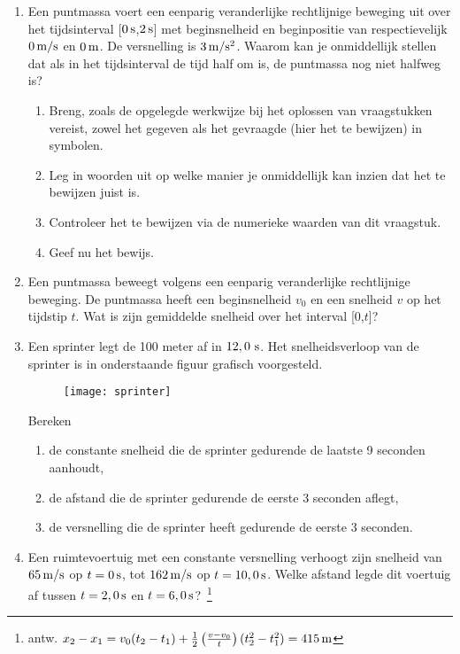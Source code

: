 \begin{enumerate}
\item Een puntmassa voert een eenparig veranderlijke rechtlijnige
beweging uit over het tijdsinterval [$0\rm\,s$,$2\rm\,s$] met
beginsnelheid en beginpositie van respectievelijk $0\rm\,m/s$ en
$0\rm\,m$. De versnelling is $3\rm\,m/s^2$. Waarom kan je
onmiddellijk stellen dat als in het tijdsinterval de tijd half om
is, de puntmassa nog niet halfweg is?
\begin{enumerate}
    \item Breng, zoals de opgelegde werkwijze bij het oplossen van
    vraag\-stuk\-ken vereist, zowel het gegeven als het gevraagde (hier
    het te bewijzen) in symbolen.
    \item Leg in woorden uit op welke manier je onmiddellijk kan
    inzien dat het te bewijzen juist is.
    \item Controleer het te bewijzen via de numerieke waarden van
    dit vraagstuk.
    \item Geef nu het bewijs.
\end{enumerate}

\item Een puntmassa beweegt volgens een eenparig veranderlijke
rechtlijnige beweging. De puntmassa heeft een beginsnelheid $v_0$ en
een snelheid $v$ op het tijdstip $t$. Wat is zijn gemiddelde
snelheid over het interval [0,$t$]?

\item Een sprinter legt de 100 meter af in
$12,0~\rm s$. Het snelheidsverloop van de sprinter is in
onderstaande figuur grafisch voorgesteld.
\begin{figure}[h]
\begin{center}
\texttt{[image: sprinter]}
\end{center}
\end{figure}
\newline
Bereken
\begin{enumerate}
\item de constante snelheid die de sprinter gedurende de laatste 9
seconden aanhoudt,
\item de afstand die de sprinter gedurende de eerste 3 seconden
aflegt,
\item de versnelling die de sprinter heeft gedurende de eerste 3 seconden.
\end{enumerate}

\item Een ruimtevoertuig met een constante versnelling verhoogt
zijn snelheid van $65\rm\,m/s$ op $t=0\rm\,s$, tot $162\rm\,m/s$ op
$t=10,0\rm\,s$. Welke afstand legde dit voertuig af tussen
$t=2,0\rm\,s$ en $t=6,0\rm\,s$?~\footnote{antw.
$x_2-x_1=v_0(t_2-t_1)+\frac{1}{2}\left(\frac{v-v_0}{t}\right)(t_2^2-t_1^2)=415\rm\,m$}




\end{enumerate}
